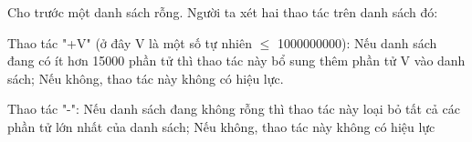 Cho trước một danh sách rỗng. Người ta xét hai thao tác  trên danh sách đó:  

   Thao tác "+V" (ở đây V là một số tự nhiên  $\le$  1000000000): Nếu danh sách đang có ít hơn 15000 phần tử thì thao tác này bổ sung thêm phần tử V vào danh sách; Nếu không, thao tác này không có hiệu lực.  

   Thao tác "-": Nếu danh sách đang không rỗng thì thao tác này loại bỏ tất cả các phần tử lớn nhất của danh sách; Nếu không, thao tác này không có hiệu lực
